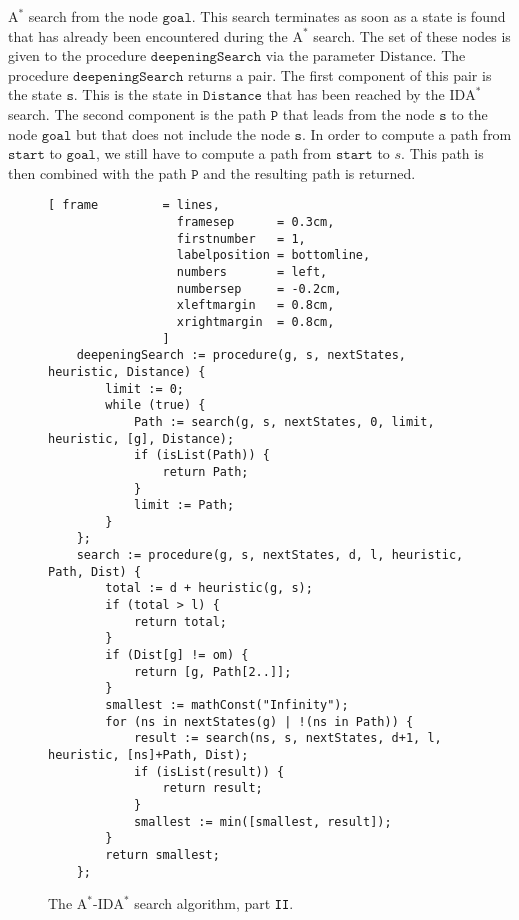 \begin{enumerate}
      $\mathrm{A}^*$ search from the node $\texttt{goal}$.  This search terminates as soon as a state is found
      that has already been encountered during the $\mathrm{A}^*$ search.  The set of these nodes is given to
      the procedure $\texttt{deepeningSearch}$ via the parameter $\mathrm{Distance}$.  The procedure
      $\texttt{deepeningSearch}$ returns a pair.  The first component of this pair is the state $\texttt{s}$.  This is
      the state in $\texttt{Distance}$ that has been reached by the $\mathrm{IDA}^*$ search.  The second component is the
      path $\texttt{P}$ that leads from the node $\texttt{s}$ to the node $\texttt{goal}$ but that does not include the node $\texttt{s}$.
      In order to compute a path from $\texttt{start}$ to $\texttt{goal}$, we still have to compute a
      path from $\texttt{start}$ to $s$.  This path is then combined with the path $\texttt{P}$ and the resulting path
      is returned.
\end{enumerate}


\begin{figure}[!ht]
\centering
\begin{Verbatim}[ frame         = lines,
                  framesep      = 0.3cm,
                  firstnumber   = 1,
                  labelposition = bottomline,
                  numbers       = left,
                  numbersep     = -0.2cm,
                  xleftmargin   = 0.8cm,
                  xrightmargin  = 0.8cm,
                ]
    deepeningSearch := procedure(g, s, nextStates, heuristic, Distance) {
        limit := 0;
        while (true) {
            Path := search(g, s, nextStates, 0, limit, heuristic, [g], Distance);
            if (isList(Path)) {
                return Path;
            }
            limit := Path;
        }
    };
    search := procedure(g, s, nextStates, d, l, heuristic, Path, Dist) {
        total := d + heuristic(g, s);
        if (total > l) {
            return total;
        }
        if (Dist[g] != om) {
            return [g, Path[2..]];
        }
        smallest := mathConst("Infinity");
        for (ns in nextStates(g) | !(ns in Path)) {
            result := search(ns, s, nextStates, d+1, l, heuristic, [ns]+Path, Dist);
            if (isList(result)) {
                return result;
            }
            smallest := min([smallest, result]);
        }
        return smallest;
    };
\end{Verbatim}
\vspace*{-0.3cm}
\caption{The $\mathrm{A}^*$-$\mathrm{IDA}^*$ search algorithm, part \texttt{II}.}
\label{fig:a-star-ida-star.stlx-2}
\end{figure}

